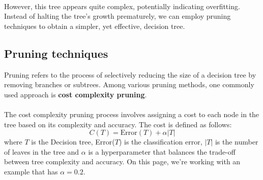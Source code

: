 \documentclass[10pt,a4paper]{report}
\begin{document}
\paragraph{}However, this tree appears quite complex, potentially indicating overfitting. Instead of halting the tree's growth prematurely, we can employ pruning techniques to obtain a simpler, yet effective, decision tree.
\subsection{Pruning techniques}
Pruning refers to the process of selectively reducing the size of a decision tree by removing branches or subtrees. Among various pruning methods, one commonly used approach is \textbf{cost complexity pruning}.
\paragraph{}The cost complexity pruning process involves assigning a cost to each node in the tree based on its complexity and accuracy. The cost is defined as follows:
$$C(T) = \textrm{Error}(T) + \alpha|T|$$
where $T$ is the Decision tree, Error($T$) is the classification error, $|T|$ is the number of leaves in the tree and $\alpha$ is a hyperparameter that balances the trade-off between tree complexity and accuracy. On this page, we're working with an example that has $\alpha=0.2$.
\end{document}
